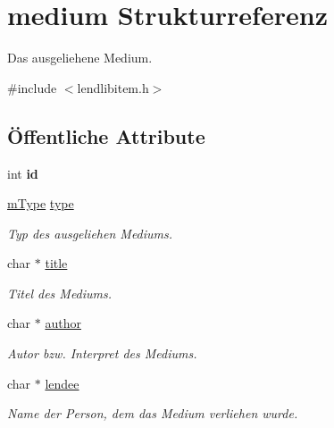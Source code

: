 \hypertarget{structmedium}{}\section{medium Strukturreferenz}
\label{structmedium}


Das ausgeliehene Medium.  




{\ttfamily \#include $<$lendlibitem.\+h$>$}

\subsection*{Öffentliche Attribute}
\begin{DoxyCompactItemize}
\item 
int {\bfseries id}\hypertarget{structmedium_a787bc365d67193410f1d36b898213979}{}\label{structmedium_a787bc365d67193410f1d36b898213979}

\item 
\hyperlink{group___lend_lib_item_ga636cfca014f3212ea82d45e28f9cb51b}{m\+Type} \hyperlink{structmedium_a863e13a6ba17d36f94c1a79acef3c0b6}{type}\hypertarget{structmedium_a863e13a6ba17d36f94c1a79acef3c0b6}{}\label{structmedium_a863e13a6ba17d36f94c1a79acef3c0b6}

\begin{DoxyCompactList}\small\item\em Typ des ausgeliehen Mediums. \end{DoxyCompactList}\item 
char $\ast$ \hyperlink{structmedium_aa4672c0637ae3b8e5afe086ab4dd2180}{title}\hypertarget{structmedium_aa4672c0637ae3b8e5afe086ab4dd2180}{}\label{structmedium_aa4672c0637ae3b8e5afe086ab4dd2180}

\begin{DoxyCompactList}\small\item\em Titel des Mediums. \end{DoxyCompactList}\item 
char $\ast$ \hyperlink{structmedium_a35c25790a53f2ba0a5fbdb333ebb8bca}{author}\hypertarget{structmedium_a35c25790a53f2ba0a5fbdb333ebb8bca}{}\label{structmedium_a35c25790a53f2ba0a5fbdb333ebb8bca}

\begin{DoxyCompactList}\small\item\em Autor bzw. Interpret des Mediums. \end{DoxyCompactList}\item 
char $\ast$ \hyperlink{structmedium_a4b535b8356bd22f22ffca4f6424bb9cb}{lendee}\hypertarget{structmedium_a4b535b8356bd22f22ffca4f6424bb9cb}{}\label{structmedium_a4b535b8356bd22f22ffca4f6424bb9cb}

\begin{DoxyCompactList}\small\item\em Name der Person, dem das Medium verliehen wurde. \end{DoxyCompactList}\end{DoxyCompactItemize}


